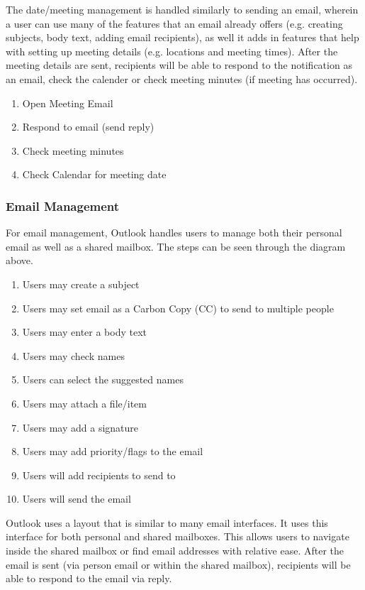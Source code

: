 \documentclass{sigchi}
\begin{document}
The date/meeting management is handled similarly to sending an email, wherein a user can use many of the features that an email already offers (e.g. creating subjects, body text, adding email recipients), as well it adds in features that help with setting up meeting details (e.g. locations and meeting times).
After the meeting details are sent, recipients will be able to respond to the notification as an email, check the calender or check meeting minutes (if meeting has occurred).


\begin{enumerate}
\item Open Meeting Email
\item Respond to email (send reply)
\item Check meeting minutes
\item Check Calendar for meeting date
\end{enumerate}

\subsubsection{Email Management}

For email management, Outlook handles users to manage both their personal email as well as a shared mailbox.  The steps can be seen through the diagram above.

\begin{enumerate}
\item Users may create a subject
\item Users may set email as a Carbon Copy (CC) to send to multiple people
\item Users may enter a body text
\item Users may check names
\item Users can select the suggested names
\item Users may attach a file/item
\item Users may add a signature
\item Users may add priority/flags to the email
\item Users will add recipients to send to
\item Users will send the email
\end{enumerate}

Outlook uses a layout that is similar to many email interfaces. It uses this interface for both personal and shared mailboxes. This allows users to navigate inside the shared mailbox or find email addresses with relative ease.
After the email is sent (via person email or within the shared mailbox), recipients will be able to respond to the email via reply.
\end{document}
